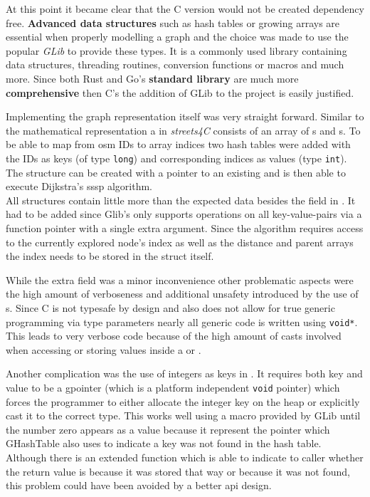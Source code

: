 At this point it became clear that the C version would not be created dependency free. \textbf{Advanced data structures} such as hash tables or growing arrays are essential when properly modelling a graph and the choice was made to use the popular \textit{GLib} to provide these types. It is a commonly used library containing data structures, threading routines, conversion functions or macros and much more. Since both Rust and Go's \textbf{standard library} are much more \textbf{comprehensive} then C's the addition of GLib to the project is easily justified.

Implementing the graph representation itself was very straight forward. Similar to the mathematical representation a  in \textit{streets4C} consists of an array of s and s. To be able to map from \gls{osm} IDs to array indices two hash tables were added with the IDs as keys (of type \lstinline[style=c]{long}) and corresponding indices as values (type \lstinline[style=c]{int}). The  structure can be created with a pointer to an existing  and is then able to execute Dijkstra's \acrshort{sssp} algorithm.
\\


All structures contain little more than the expected data besides the  field in . It had to be added since Glib's  only supports operations on all key-value-pairs via a function pointer with a single extra argument. Since the algorithm requires access to the currently explored node's index as well as the distance and parent arrays the index needs to be stored in the struct itself.

While the extra field was a minor inconvenience other problematic aspects were the high amount of verboseness and additional unsafety introduced by the use of s. Since C is not typesafe by design and also does not allow for true generic programming via type parameters nearly all generic code is written using \lstinline[style=c]{void*}. This leads to very verbose code because of the high amount of casts involved when accessing or storing values inside a  or .

Another complication was the use of integers as keys in . It requires both key and value to be a gpointer (which is a platform independent \lstinline{void} pointer) which forces the programmer to either allocate the integer key on the heap or explicitly cast it to the correct type. This works well using a macro provided by GLib until the number zero appears as a value because it represent the  pointer which GHashTable also uses to indicate a key was not found in the hash table. Although there is an extended function which is able to indicate to caller whether the return value is  because it was stored that way or because it was not found, this problem could have been avoided by a better \acrshort{api} design.

